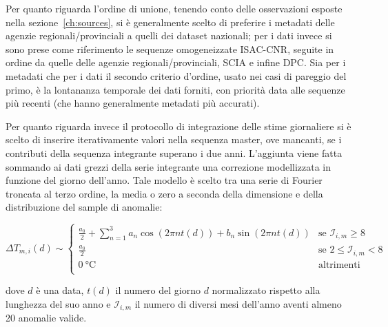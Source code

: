 Per quanto riguarda l'ordine di unione, tenendo conto delle osservazioni esposte nella sezione~\ref{ch:sources}, si è generalmente scelto di preferire i metadati delle agenzie regionali/provinciali a quelli dei dataset nazionali; per i dati invece si sono prese come riferimento le sequenze omogeneizzate ISAC-CNR, seguite in ordine da quelle delle agenzie regionali/provinciali, SCIA e infine DPC. Sia per i metadati che per i dati il secondo criterio d'ordine, usato nei casi di pareggio del primo, è la lontananza temporale dei dati forniti, con priorità data alle sequenze più recenti (che hanno generalmente metadati più accurati).

Per quanto riguarda invece il protocollo di integrazione delle stime giornaliere si è scelto di inserire iterativamente valori nella sequenza master, ove mancanti, se i contributi della sequenza integrante superano i due anni. L'aggiunta viene fatta sommando ai dati grezzi della serie integrante una correzione modellizzata in funzione del giorno dell'anno. Tale modello è scelto tra una serie di Fourier troncata al terzo ordine, la media o zero a seconda della dimensione e della distribuzione del sample di anomalie:

\[
  \Delta T_{m,i}(d) \sim
  \begin{cases}
    \frac{a_0}{2} + \sum^3_{n=1} a_n \cos( 2\pi n t(d)) + b_n\sin(2\pi n t(d)) & \text{se } \mathcal{I}_{i,m} \ge 8 \\
    \frac{a_0}{2} & \text{se } 2 \le \mathcal{I}_{i,m} < 8 \\
    \qty{0}{\degreeCelsius} & \text{altrimenti} \\
  \end{cases}
\]

dove \(d\) è una data, \(t(d)\) il numero del giorno \(d\) normalizzato rispetto alla lunghezza del suo anno e \(\mathcal{I}_{i,m}\) il numero di diversi mesi dell'anno aventi almeno 20 anomalie valide.
